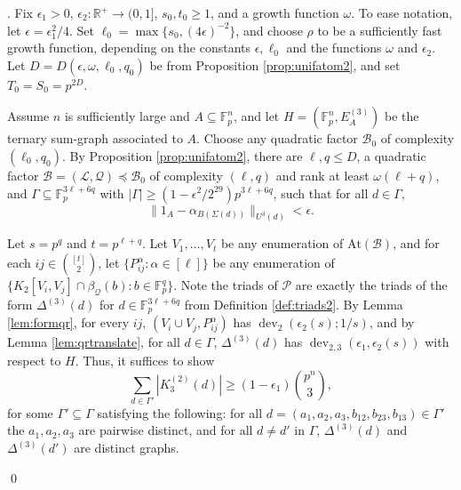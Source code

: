 \documentclass[12pt,oneside,british,a4wide]{amsart}
\numberwithin{equation}{section}
\theoremstyle{definition}
\def\F{\mathbb{F}}
\def\e{\epsilon}
\newcommand{\calL}{\mathcal{L}}
\newcommand{\calB}{\mathcal{B}}
\newcommand{\calP}{\mathcal{P}}
\newcommand{\calQ}{\mathcal{Q}}
\newcommand{\At}{{\mathrm{At}}}
\def\dev{\operatorname{dev}}
\newenvironment{proofof}[1]{\indent{\itshape Proof of #1}.\;}{\qed}
\begin{document}
\begin{proofof}{Theorem \ref{thm:hypergraphreg}} 
Fix $\e_1>0$,  $\e_2:\mathbb{R}^+\rightarrow (0,1]$, $s_0,t_0\geq 1$, and a growth function $\omega$.  To ease notation, let $\e=\e_1^2/4$.  Set $\ell_0=\max\{s_0, (4\e)^{-2}\}$, and choose $\rho$ to be a sufficiently fast growth function, depending on the constants $\e, \ell_0$ and the functions $\omega$ and $\e_2$.  Let $D=D(\e,\omega,\ell_0,q_0)$ be from Proposition \ref{prop:unifatom2}, and set $T_0=S_0=p^{2D}$.   

Assume $n$ is sufficiently large and $A\subseteq \F_p^n$, and let $H=(\F_p^n, E_A^{(3)})$ be the ternary sum-graph associated to $A$.  Choose any quadratic factor $\calB_0$ of complexity $(\ell_0,q_0)$.  By Proposition \ref{prop:unifatom2}, there are $\ell,q\leq D$, a quadratic factor $\calB=(\calL,\calQ)\preceq \calB_0$ of complexity $(\ell, q)$ and rank at least $\omega(\ell+q)$, and $\Gamma\subseteq \mathbb{F}_p^{3\ell+6q}$ with $|\Gamma|\geq (1-\e^2/2^{29})p^{3\ell+6q}$, such that for all $d\in \Gamma$,  
$$
\|1_A-\alpha_{B(\Sigma(d))}\|_{U^3(d)}<\e.
$$

Let $s=p^{q}$ and $t=p^{\ell+q}$.  Let $V_1,\ldots, V_t$ be any enumeration of $\At(\calB)$, and for each $ij\in {[t]\choose 2}$, let $\{P_{ij}^{\alpha}: \alpha\in [\ell]\}$ be any enumeration of $\{K_2[V_i,V_j]\cap \beta_{\calQ}(b): b\in \F_p^{q}\}$.  Note the triads of $\calP$ are exactly the triads of the form $\Delta^{(3)}(d)$ for $d\in \F_p^{3\ell+6q}$ from Definition \ref{def:triads2}.  By Lemma \ref{lem:formqr}, for every $ij$, $(V_i\cup V_j, P_{ij}^\alpha)$ has $\dev_2(\e_2(s);1/s)$, and by  Lemma \ref{lem:qrtranslate}, for all $d\in \Gamma$, $\Delta^{(3)}(d)$ has $\dev_{2,3}(\e_1,\e_2(s))$ with respect to $H$.  Thus, it suffices to show 
$$
\sum_{d\in \Gamma'}|K_3^{(2)}(d)|\geq (1-\e_1){p^n\choose 3},
$$
for some $\Gamma'\subseteq \Gamma$ satisfying the following:  for all $d=(a_1,a_2,a_3,b_{12},b_{23},b_{13})\in \Gamma'$ the  $a_1,a_2,a_3$ are pairwise distinct, and for all $d\neq d'$ in $\Gamma$,  $\Delta^{(3)}(d)$ and $\Delta^{(3)}(d')$ are distinct graphs.  


\end{proofof}
\end{document}
